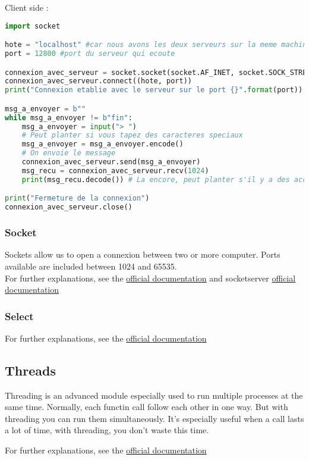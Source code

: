 \documentclass[a4paper, 12pt, titlepage]{scrartcl} %
\begin{document}
Client side :
\begin{lstlisting}[language=Python]
import socket

hote = "localhost" #car nous avons les deux serveurs sur la meme machine
port = 12800 #port du serveur qui ecoute

connexion_avec_serveur = socket.socket(socket.AF_INET, socket.SOCK_STREAM)
connexion_avec_serveur.connect((hote, port))
print("Connexion etablie avec le serveur sur le port {}".format(port))

msg_a_envoyer = b""
while msg_a_envoyer != b"fin":
    msg_a_envoyer = input("> ")
    # Peut planter si vous tapez des caracteres speciaux
    msg_a_envoyer = msg_a_envoyer.encode()
    # On envoie le message
    connexion_avec_serveur.send(msg_a_envoyer)
    msg_recu = connexion_avec_serveur.recv(1024)
    print(msg_recu.decode()) # La encore, peut planter s'il y a des accents

print("Fermeture de la connexion")
connexion_avec_serveur.close()
\end{lstlisting} \vspace{5mm}

\subsubsection{Socket}
Sockets allow us to open a connexion between two or more computer. Ports available are included between 1024 and 65535. \\
For further explanations, see the \href{https://docs.python.org/3/library/socket.html}{official documentation} and socketserver  \href{https://docs.python.org/3/library/socketserver.html}{official documentation} 
\subsubsection{Select}
For further explanations, see the \href{https://docs.python.org/3/library/select.html}{official documentation}

\subsection{Threads}
Threading is an advanced module especially used to run multiple processes at the same time. Normally, each functin call follow each other in one way. But with threading you can run them simultaneously. It's especially useful when a call lasts a lot of time, with threading, you don't waste this time.

For further explanations, see the \href{https://docs.python.org/3/library/threading.html}{official documentation}
\end{document}
